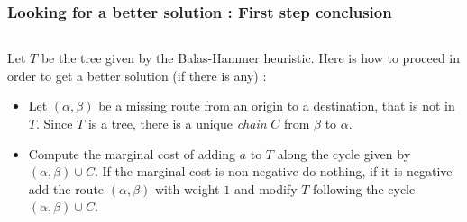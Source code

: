 \documentclass[32pt,aspectratio=169]{beamer}
\begin{document}
\begin{frame}
  \frametitle{Looking for a better solution : First step conclusion}
  \begin{columns}
    \begin{column}{.6\textwidth}
      Let $T$ be the tree given by the Balas-Hammer heuristic. Here
      is how to proceed in order to get a better solution (if there is
      any) :
      \begin{itemize}
      \item<1-> Let $(\alpha, \beta)$ be a missing route from an origin
        to a destination, that is not in $T$. Since $T$ is a tree,
        there is a unique \emph{chain} $C$ from $\beta$ to
        $\alpha$. 
      \item<2-> Compute the marginal cost of adding $a$ to $T$ along
        the cycle given by $(\alpha, \beta) \cup C$. If the marginal
        cost is non-negative do nothing, if it is negative add the
        route $(\alpha, \beta)$ with weight $1$ and modify $T$
        following the cycle $(\alpha, \beta) \cup C$.
      \end{itemize}


\end{column}
\end{columns}
\end{frame}
\end{document}
